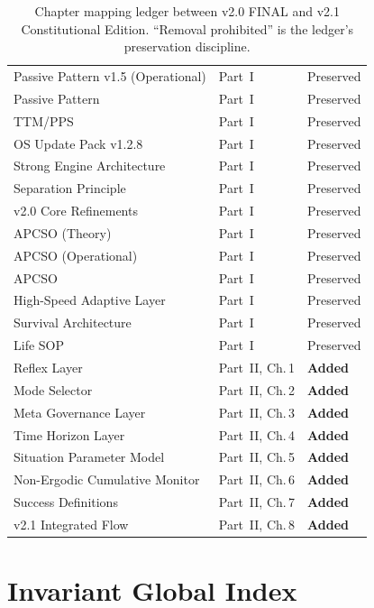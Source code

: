 \begin{table}[ht]
\begin{tabularx}{\linewidth}{lXl}
Passive Pattern v1.5 (Operational) & Part~I & Preserved \\
Passive Pattern                & Part~I & Preserved \\
TTM/PPS                        & Part~I & Preserved \\
OS Update Pack v1.2.8          & Part~I & Preserved \\
Strong Engine Architecture     & Part~I & Preserved \\
Separation Principle           & Part~I & Preserved \\
v2.0 Core Refinements          & Part~I & Preserved \\
APCSO (Theory)                 & Part~I & Preserved \\
APCSO (Operational)            & Part~I & Preserved \\
APCSO                          & Part~I & Preserved \\
High-Speed Adaptive Layer      & Part~I & Preserved \\
Survival Architecture          & Part~I & Preserved \\
Life SOP                       & Part~I & Preserved \\
\midrule
Reflex Layer                   & Part~II, Ch.\,1 & \textbf{Added} \\
Mode Selector                  & Part~II, Ch.\,2 & \textbf{Added} \\
Meta Governance Layer          & Part~II, Ch.\,3 & \textbf{Added} \\
Time Horizon Layer             & Part~II, Ch.\,4 & \textbf{Added} \\
Situation Parameter Model      & Part~II, Ch.\,5 & \textbf{Added} \\
Non-Ergodic Cumulative Monitor & Part~II, Ch.\,6 & \textbf{Added} \\
Success Definitions            & Part~II, Ch.\,7 & \textbf{Added} \\
v2.1 Integrated Flow           & Part~II, Ch.\,8 & \textbf{Added} \\
\bottomrule
\end{tabularx}
\caption[Chapter mapping ledger]{Chapter mapping ledger between v2.0
FINAL and v2.1 Constitutional Edition. ``Removal prohibited'' is the
ledger's preservation discipline.}
\label{tab:chapter-mapping-ledger}
\end{table}

\section{Invariant Global Index}
\label{sec:invariant-global-index}

